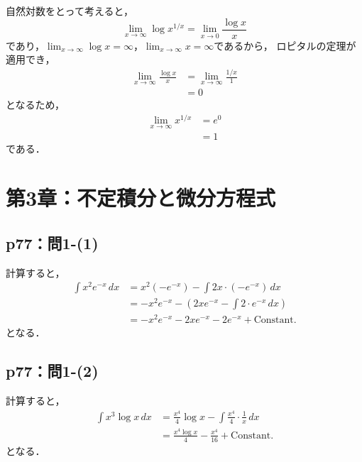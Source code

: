 \documentclass[uplatex,dvipdfmx,a4paper,10pt,fleqn]{jsarticle}
\newenvironment{tleftbar}{\begin{tbleftline}\setlength{\parindent}{1zw}}{\end{tbleftline}}
\begin{document}
    \begin{tleftbar}
        自然対数をとって考えると，
        \[
            \lim_{x \to \infty} \log x^{1/x}  = \lim_{x \to 0} \frac{\log x}{x} 
        \]
        であり，$\lim_{x \to \infty} \log x = \infty$，$\lim_{x \to \infty} x = \infty$であるから，
        ロピタルの定理が適用でき，
        \begin{align*} 
            \lim_{x \to \infty} \frac{\log x}{x}  & = \lim_{ x \to \infty} \frac{1/x}{1} \\
            & = 0 
        \end{align*} 
        となるため，
        \begin{align*}
            \lim_{x \to \infty} x^{1/x} &= e^0  \\
            & =1 
        \end{align*}
        である．
    \end{tleftbar}

\section*{第3章：不定積分と微分方程式}


\subsection*{p77：問1-(1)}

\begin{tleftbar}
    計算すると，
    \begin{align*} 
       \int  x^2 e^{-x} \, dx & = x^2 (-e^{-x})-\int 2x \cdot (-e^{-x})\, dx \\
       & =-x^2 e^{-x} -\left (2xe^{-x}-\int 2 \cdot e^{-x} \, dx \right) \\
       & = -x^2 e^{-x} - 2xe^{-x} -2e^{-x}+\mathrm{Constant.}
    \end{align*} 
    となる．
\end{tleftbar}


\subsection*{p77：問1-(2)}



\begin{tleftbar}
    計算すると，
    \begin{align*} 
       \int  x^3 \log x \, dx & = \frac{x^4}{4} \log x - \int \frac{x^4}{4} \cdot \frac{1}{x} \, dx \\
       & = \frac{x^4\log x}{4} - \frac{x^4}{16} + \mathrm{Constant.}
    \end{align*}
        となる．
\end{tleftbar}
\end{document}
